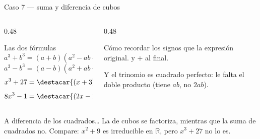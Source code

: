\documentclass[aspectratio=169,10pt]{beamer}
\begin{document}
\begin{frame}{Caso 7 — suma y diferencia de cubos}
  \scriptsize
  \begin{columns}[T,onlytextwidth]
    \begin{column}{0.48\textwidth}
      \begin{block}{Las dos fórmulas}
        \tiny
        \[ a^{3}+b^{3} = (a+b)(a^{2}-ab+b^{2}) \]
        \[ a^{3}-b^{3} = (a-b)(a^{2}+ab+b^{2}) \]
        \[ x^{3}+27 = \destacar{(x+3)(x^{2}-3x+9)} \]
        \[ 8x^{3}-1 = \destacar{(2x-1)(4x^{2}+2x+1)} \]
      \end{block}
    \end{column}
    \begin{column}{0.48\textwidth}
      \begin{alertblock}{Cómo recordar los signos}
        \tiny
         que la expresión original.
         y  $+$ al final.

        \vspace{0.08cm}
        Y el trinomio  es cuadrado perfecto: le falta el doble
        producto (tiene $ab$, no $2ab$).
      \end{alertblock}
    \end{column}
  \end{columns}

  \vspace{0.1cm}
  \begin{exampleblock}{A diferencia de los cuadrados\dots}
    \scriptsize
    La  de cubos  se factoriza, mientras que la suma de
    cuadrados no. Compare: $x^{2}+9$ es irreducible en $\mathbb{R}$, pero
    $x^{3}+27$ no lo es.
  \end{exampleblock}
\end{frame}
\end{document}
